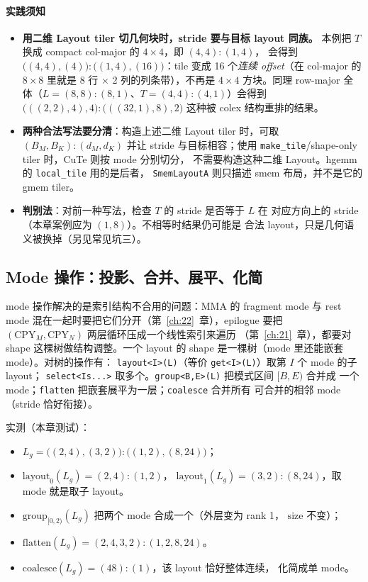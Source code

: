 \paragraph{实践须知}
\begin{itemize}
  \item \textbf{用二维 Layout tiler 切几何块时，stride 要与目标 layout 同族。}
        本例把 $T$ 换成 compact col-major 的 $4\times4$，即 $(4,4){:}(1,4)$，
        会得到 $\bigl((4,4),(4)\bigr){:}\bigl((1,4),(16)\bigr)$：tile 变成
        16 个\emph{连续 offset}（在 col-major 的 $8\times8$ 里就是
        8 行 $\times$ 2 列的列条带），不再是 $4\times4$ 方块。同理
        row-major 全体（$L=(8,8){:}(8,1)$、$T=(4,4){:}(4,1)$）会得到
        $\bigl(((2,2),4),4\bigr){:}\bigl(((32,1),8),2\bigr)$ 这种被 colex
        结构重排的结果。
  \item \textbf{两种合法写法要分清}：构造上述二维 Layout tiler 时，可取
        $(B_M,B_K){:}(d_M,d_K)$ 并让 stride 与目标相容；使用
        \texttt{make\_tile}/shape-only tiler 时，CuTe 则按 mode 分别切分，
        不需要构造这种二维 Layout。hgemm 的 \texttt{local\_tile} 用的是后者，
        \texttt{SmemLayoutA} 则只描述 smem 布局，并不是它的 gmem tiler。
  \item \textbf{判别法}：对前一种写法，检查 $T$ 的 stride 是否等于 $L$ 在
        对应方向上的 stride（本章案例应为 $(1,8)$）。不相等时结果仍可能是
        合法 layout，只是几何语义被换掉（另见常见坑三）。
\end{itemize}

\subsection{Mode 操作：投影、合并、展平、化简}

mode 操作解决的是索引结构不合用的问题：MMA 的 fragment mode 与 rest
mode 混在一起时要把它们分开（第~\ref{ch:22}~章），epilogue 要把
$(\mathrm{CPY}_M,\mathrm{CPY}_N)$ 两层循环压成一个线性索引来遍历
（第~\ref{ch:21}~章），都要对 shape 这棵树做结构调整。一个 layout 的 shape
是一棵树（mode 里还能嵌套 mode）。对树的操作有：
\texttt{layout\allowbreak{}<I>\allowbreak{}(L)}（等价 \texttt{get<I>(L)}）取第 $I$ 个 mode 的子 layout；
\texttt{select\allowbreak{}<Is.\allowbreak{}.\allowbreak{}.\allowbreak{}>} 取多个。\texttt{group\allowbreak{}<B,\allowbreak{}E>\allowbreak{}(L)} 把模式区间 $[B,E)$ 合并成
一个 mode；\texttt{flatten} 把嵌套展平为一层；\texttt{coalesce} 合并所有
可合并的相邻 mode（stride 恰好衔接）。

实测（本章测试）：
\begin{itemize}
  \item $L_g = \bigl((2,4),(3,2)\bigr){:}\bigl((1,2),(8,24)\bigr)$；
  \item $\mathrm{layout}_0(L_g) = (2,4){:}(1,2)$，
        $\mathrm{layout}_1(L_g) = (3,2){:}(8,24)$，取 mode 就是取子 layout。
  \item $\mathrm{group}_{[0,2)}(L_g)$ 把两个 mode 合成一个（外层变为 rank 1，
        $\mathrm{size}$ 不变）；
  \item $\mathrm{flatten}(L_g) = (2,4,3,2){:}(1,2,8,24)$。
  \item $\mathrm{coalesce}(L_g) = (48){:}(1)$，该 layout 恰好整体连续，
        化简成单 mode。
\end{itemize}

